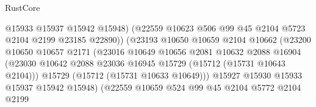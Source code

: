 \begin{lexlean}{RustCore}
\begin{coremodule}
                                        @15933
                                        @15937
                                        @15942
                                        @15948)
                                      (@22559
                                        @10623
                                        @506
                                        @99
                                        @45
                                        @2104
                                        @5723
                                        @2104
                                        @2199
                                        @23185
                                        @22890))
                                    (@23193
                                      @10650
                                      @10659
                                      @2104
                                      @10662
                                      (@23200
                                        @10650
                                        @10657
                                        @2171
                                        (@23016
                                          @10649
                                          @10656
                                          @2081
                                          @10632
                                          @2088
                                          @16904
                                          (@23030
                                            @10642
                                            @2088
                                            @23036
                                            @16945
                                            @15729
                                            (@15712 (@15731 @10643 @2104)))
                                          @15729
                                          (@15712 (@15731 @10633 @10649)))
                                        @15927
                                        @15930
                                        @15933
                                        @15937
                                        @15942
                                        @15948)
                                      (@22559
                                        @10659
                                        @524
                                        @99
                                        @45
                                        @2104
                                        @5772
                                        @2104
                                        @2199

\end{coremodule}
\end{lexlean}
